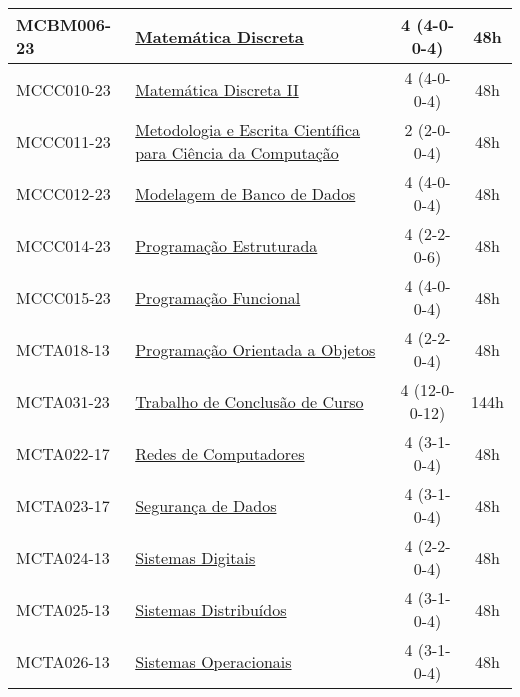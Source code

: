 \begin{table}[h!]
\begin{tabular}{|l|p{}|c|c|}
        \hline
        MCBM006-23 & \hyperref[disc:mdI]{Matemática Discreta} & 4 (4-0-0-4) & 48h \\
        \hline
        MCCC010-23 & \hyperref[disc:mdII]{Matemática Discreta II} & 4 (4-0-0-4) & 48h \\
        \hline
        MCCC011-23 & \hyperref[disc:metod]{Metodologia e Escrita Científica para Ciência da Computação} & 2 (2-0-0-4) & 48h \\
        \hline
        MCCC012-23 & \hyperref[disc:mbd]{Modelagem de Banco de Dados} & 4 (4-0-0-4) & 48h \\
        \hline
        \hline
        MCCC014-23 & \hyperref[disc:pe]{Programação Estruturada} & 4 (2-2-0-6) & 48h \\
        \hline
        MCCC015-23 & \hyperref[disc:pf]{Programação Funcional} & 4 (4-0-0-4) & 48h \\
        \hline
        MCTA018-13 & \hyperref[disc:poo]{Programação Orientada a Objetos} & 4 (2-2-0-4) & 48h \\
        \hline
        MCTA031-23 & \hyperref[disc:tccIII]{Trabalho de Conclusão de Curso} & 4 (12-0-0-12) & 144h \\
        \hline
        MCTA022-17 & \hyperref[disc:redes]{Redes de Computadores} & 4 (3-1-0-4) & 48h \\
        \hline
        MCTA023-17 & \hyperref[disc:seg]{Segurança de Dados} & 4 (3-1-0-4) & 48h \\
        \hline
        MCTA024-13 & \hyperref[disc:sist_dig]{Sistemas Digitais} & 4 (2-2-0-4) & 48h \\
        \hline
        MCTA025-13 & \hyperref[disc:sist_distr]{Sistemas Distribuídos} & 4 (3-1-0-4) & 48h \\
        \hline
        MCTA026-13 & \hyperref[disc:so]{Sistemas Operacionais} & 4 (3-1-0-4) & 48h\\
        \hline
    \end{tabular}
\end{table}

